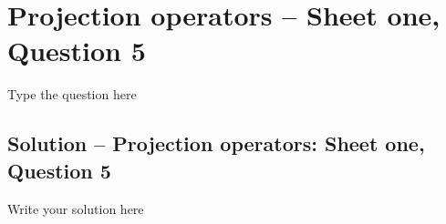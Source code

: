 \section{Projection operators -- Sheet one, Question 5}
Type  the question here


\subsection{Solution -- Projection operators: Sheet one, Question 5}

Write your solution here